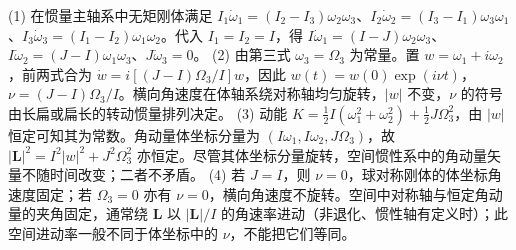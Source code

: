 (1) 在惯量主轴系中无矩刚体满足 \(I_1\dot\omega_1=(I_2-I_3)\omega_2\omega_3\)、\(I_2\dot\omega_2=(I_3-I_1)\omega_3\omega_1\)、\(I_3\dot\omega_3=(I_1-I_2)\omega_1\omega_2\)。代入 \(I_1=I_2=I\)，得 \(I\dot\omega_1=(I-J)\omega_2\omega_3\)、\(I\dot\omega_2=(J-I)\omega_1\omega_3\)、\(J\dot\omega_3=0\)。
(2) 由第三式 \(\omega_3=\Omega_3\) 为常量。置 \(w=\omega_1+i\omega_2\)，前两式合为 \(\dot w=i[(J-I)\Omega_3/I]w\)，因此 \(w(t)=w(0)\exp(i\nu t)\)，\(\nu=(J-I)\Omega_3/I\)。横向角速度在体轴系绕对称轴均匀旋转，\(|w|\) 不变，\(\nu\) 的符号由长扁或扁长的转动惯量排列决定。
(3) 动能 \(K=\tfrac12I(\omega_1^2+\omega_2^2)+\tfrac12J\Omega_3^2\)，由 \(|w|\) 恒定可知其为常数。角动量体坐标分量为 \((I\omega_1,I\omega_2,J\Omega_3)\)，故 \(|\boldsymbol L|^2=I^2|w|^2+J^2\Omega_3^2\) 亦恒定。尽管其体坐标分量旋转，空间惯性系中的角动量矢量不随时间改变；二者不矛盾。
(4) 若 \(J=I\)，则 \(\nu=0\)，球对称刚体的体坐标角速度固定；若 \(\Omega_3=0\) 亦有 \(\nu=0\)，横向角速度不旋转。空间中对称轴与恒定角动量的夹角固定，通常绕 \(\boldsymbol L\) 以 \(|\boldsymbol L|/I\) 的角速率进动（非退化、惯性轴有定义时）；此空间进动率一般不同于体坐标中的 \(\nu\)，不能把它们等同。
